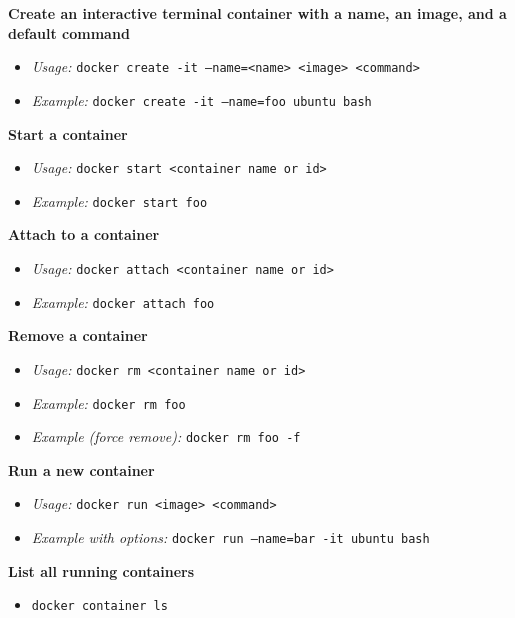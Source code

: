 \documentclass{article}
\begin{document}
\textbf{Create an interactive terminal container with a name, an image, and a default command}

\begin{itemize}
  \item \textit{Usage:} \texttt{docker create -it --name=<name> <image> <command>}
  \item \textit{Example:} \texttt{docker create -it --name=foo ubuntu bash}
\end{itemize}

\textbf{Start a container}

\begin{itemize}
  \item \textit{Usage:} \texttt{docker start <container name or id>}
  \item \textit{Example:} \texttt{docker start foo}
\end{itemize}

\textbf{Attach to a container}

\begin{itemize}
  \item \textit{Usage:} \texttt{docker attach <container name or id>}
  \item \textit{Example:} \texttt{docker attach foo}
\end{itemize}

\textbf{Remove a container}

\begin{itemize}
  \item \textit{Usage:} \texttt{docker rm <container name or id>}
  \item \textit{Example:} \texttt{docker rm foo}
  \item \textit{Example (force remove):} \texttt{docker rm foo -f}
\end{itemize}

\textbf{Run a new container}

\begin{itemize}
  \item \textit{Usage:} \texttt{docker run <image> <command>}
  \item \textit{Example with options:} \texttt{docker run --name=bar -it ubuntu bash}
\end{itemize}

\textbf{List all running containers}

\begin{itemize}
  \item \texttt{docker container ls}
\end{itemize}
\end{document}
